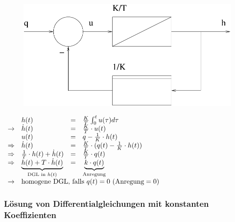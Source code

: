 \message{ !name(Mitschrieb_SysRegel.tex)}\documentclass[12pt,a4paper,ngerman]{scrartcl}
\begin{document}
   \begin{figure}[H]
     \centering
     \includegraphics[width=.5\linewidth]{sysregel_bsb6}
   \end{figure}
   \begin{math}
     \begin{array}{llll}
       &h(t)&=&\frac{K}{T}\int_0^t{u(\tau)d\tau}\\
     \rightarrow&\dot{h}(t)&=&\frac{K}{T}\cdot u(t)\\
     &u(t)&=&q-\frac{1}{K}\cdot h(t)\\
     \Rightarrow&\dot{h}(t)&=&\frac{K}{T}\cdot (q(t)-\frac{1}{K} \cdot{h}(t))\\
     \Rightarrow&\frac{1}{T}\cdot h(t)+\dot{h}(t)&=&\frac{K}{T}\cdot q(t)\\
     \Rightarrow&\underbrace{h(t)+T\cdot \dot{h}(t)}_{\text{DGL in }h(t)}&=&\underbrace{k\cdot q(t)}_{\text{Anregung}}\\

     \rightarrow& \multicolumn{3}{l}{\text{homogene DGL, falls }q(t)=0 \text{ (Anregung}=0)}
   \end{array}
  \end{math}

  \subsubsection{Lösung von Differentialgleichungen mit konstanten Koeffizienten}
\end{document}
